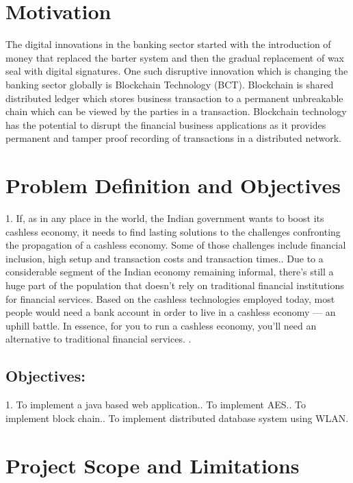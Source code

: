 \documentclass[oneside,a4paper,12pt]{report}
\begin{document}
\section{Motivation}
The digital innovations in the banking sector started with the introduction of money that replaced the barter system and then the gradual replacement of wax seal with digital signatures.  One such disruptive innovation which is changing the banking sector globally is Blockchain Technology (BCT). Blockchain is shared distributed ledger which stores business transaction to a permanent unbreakable chain which can be viewed by the parties in a transaction. Blockchain technology has the potential to disrupt the ﬁnancial business applications as it provides permanent and tamper proof recording of transactions in a distributed network.
\section{Problem Definition and Objectives}
1.	If, as in any place in the world, the Indian government wants to boost its cashless economy, it needs to find lasting solutions to the challenges confronting the propagation of a cashless economy. Some of those challenges include financial inclusion, high setup and transaction costs and transaction times..	Due to a considerable segment of the Indian economy remaining informal, there’s still a huge part of the population that doesn’t rely on traditional financial institutions for financial services. Based on the cashless technologies employed today, most people would need a bank account in order to live in a cashless economy — an uphill battle. In essence, for you to run a cashless economy, you’ll need an alternative to traditional financial services.
.
\subsection{Objectives:}


1.	To implement a java based web application..	To implement AES..	To implement block chain..	To implement distributed database system using WLAN.\newline
\section{Project Scope and Limitations}
\end{document}
